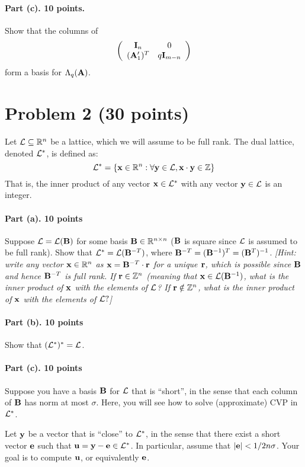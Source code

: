 \documentclass{article}
\begin{document}
\paragraph{Part (c). 10 points.} Show that the columns of
\[\left(\begin{array}{cc}{\mathbf{I}}_{n}&0\\({\mathbf{A}}_1')^T&q{\mathbf{I}}_{m-n}\end{array}\right)\]
form a basis for $\Lambda_q({\mathbf{A}})$.


\section{Problem 2 (30 points)}

Let ${\mathcal{L}}\subseteq {\mathbb{R}}^n$ be a lattice, which we will assume to be full rank. The dual lattice, denoted ${\mathcal{L}}^*$, is defined as: \[{\mathcal{L}}^*=\{{\mathbf{x}}\in{\mathbb{R}}^n:\forall {\mathbf{y}}\in{\mathcal{L}},{\mathbf{x}}\cdot{\mathbf{y}}\in{\mathbb{Z}}\}\]
That is, the inner product of any vector ${\mathbf{x}}\in{\mathcal{L}}^*$ with any vector ${\mathbf{y}}\in{\mathcal{L}}$ is an integer.

\paragraph{Part (a). 10 points} Suppose ${\mathcal{L}}={\mathcal{L}}({\mathbf{B}})$ for some basis ${\mathbf{B}}\in{\mathbb{R}}^{n\times n}$ (${\mathbf{B}}$ is square since ${\mathcal{L}}$ is assumed to be full rank). Show that ${\mathcal{L}}^*={\mathcal{L}}({\mathbf{B}}^{-T})$, where ${\mathbf{B}}^{-T}=({\mathbf{B}}^{-1})^T=({\mathbf{B}}^T)^{-1}$.
\emph{[Hint: write any vector ${\mathbf{x}}\in{\mathbb{R}}^n$ as ${\mathbf{x}}={\mathbf{B}}^{-T}\cdot{\mathbf{r}}$ for a unique ${\mathbf{r}}$, which is possible since ${\mathbf{B}}$ and hence ${\mathbf{B}}^{-T}$ is full rank. If ${\mathbf{r}}\in{\mathbb{Z}}^n$ (meaning that ${\mathbf{x}}\in{\mathcal{L}}({\mathbf{B}}^{-1})$, what is the inner product of ${\mathbf{x}}$ with the elements of ${\mathcal{L}}$? If ${\mathbf{r}}\notin{\mathbb{Z}}^n$, what is the inner product of ${\mathbf{x}}$ with the elements of ${\mathcal{L}}?$]}

\paragraph{Part (b). 10 points} Show that $({\mathcal{L}}^*)^*={\mathcal{L}}$.

\paragraph{Part (c). 10 points} Suppose you have a basis ${\mathbf{B}}$ for ${\mathcal{L}}$ that is ``short'', in the sense that each column of ${\mathbf{B}}$ has norm at most $\sigma$. Here, you will see how to solve (approximate) CVP in ${\mathcal{L}}^*$. 

Let ${\mathbf{y}}$ be a vector that is ``close'' to ${\mathcal{L}}^*$, in the sense that there exist a short vector ${\mathbf{e}}$ such that  ${\mathbf{u}}={\mathbf{y}}-{\mathbf{e}}\in{\mathcal{L}}^*$. In particular, assume that $|{\mathbf{e}}|<1/2n\sigma$. Your goal is to compute ${\mathbf{u}}$, or equivalently ${\mathbf{e}}$.
\end{document}
